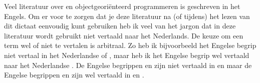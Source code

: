 Veel literatuur over \Cpp{} en objectgeoriënteerd programmeren is geschreven in het Engels. Om er voor te zorgen dat je deze literatuur na (of tijdens) het lezen van dit dictaat eenvoudig kunt gebruiken heb ik veel van het jargon dat in deze literatuur wordt gebruikt niet vertaald naar het Nederlands. De keuze om een term wel of niet te vertalen is arbitraal. Zo heb ik bijvoorbeeld het Engelse begrip  niet vertaal in het Nederlandse  of , maar heb ik het Engelse begrip  wel vertaald naar het Nederlandse . De Engelse begrippen  en  zijn niet vertaald in  en  maar de Engelse begrippen  en  zijn wel vertaald in  en . 


\setcounter{tocdepth}{4}
\setcounter{secnumdepth}{4}
\tableofcontents
\cleardoublepage

\mainmatter

